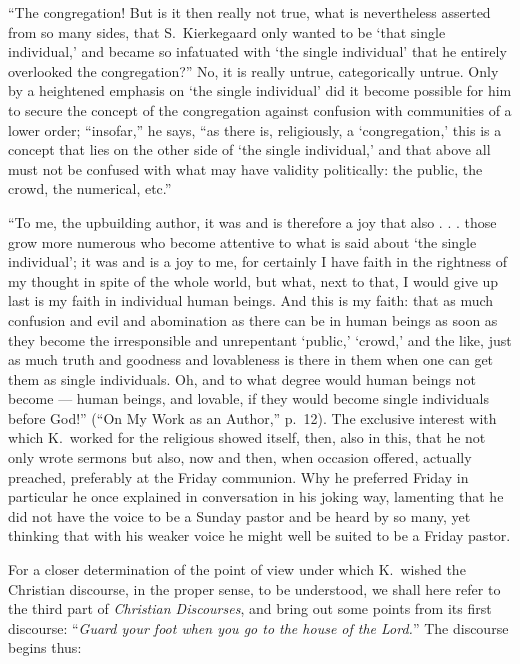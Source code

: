 \documentclass[12pt,a4paper]{article}
\newcommand{\opage}[1]{\marginnote{\footnotesize\textit{[#1]}}}
\begin{document}
``The congregation! But is it then really not true, what is nevertheless
asserted from so many sides, that S.\ Kierkegaard only wanted to be
`that single individual,' and became so infatuated with `the single
individual' that he entirely overlooked the congregation?'' No, it is
really untrue, categorically untrue. Only by a heightened emphasis on
`the single individual' did it become possible for him to secure the
concept of the congregation against confusion with communities of a
lower order; ``insofar,'' he says, ``as there is, religiously, a
`congregation,' this is a concept that lies on the other side of `the
single individual,' and that above all must not be confused with what
may have validity politically: the public, the crowd, the numerical,
etc.''

``To me, the upbuilding author, it was and is therefore a joy that
also . . . those grow more numerous who become attentive to what is said
about `the single individual'; it was and is a joy to me, for
certainly I have faith in the rightness of my thought in spite of the
whole world, but what, next to that, I would give up last is my faith
in individual human beings. And this is my faith: that as much
confusion and evil and abomination as there can be in human beings as
soon as they become the irresponsible and unrepentant `public,'
`crowd,' and the like, just as much truth and goodness and lovableness
is there in them when one can get them as single individuals. Oh, and
to what degree would human beings not become --- human beings, and
lovable, if they would become single individuals before God!''
(``On My Work as an Author,'' p.~12).
\opage{12}The exclusive interest with which K.\ worked for the religious
showed itself, then, also in this, that he not only wrote sermons but
also, now and then, when occasion offered, actually preached,
preferably at the Friday communion. Why he preferred Friday in
particular he once explained in conversation in his joking way,
lamenting that he did not have the voice to be a Sunday pastor and be
heard by so many, yet thinking that with his weaker voice he might well
be suited to be a Friday pastor.

For a closer determination of the point of view under which K.\ wished
the Christian discourse, in the proper sense, to be understood, we shall
here refer to the third part of \emph{Christian Discourses}, and bring
out some points from its first discourse: ``\emph{Guard your foot when
you go to the house of the Lord.}'' The discourse begins thus:
\end{document}
